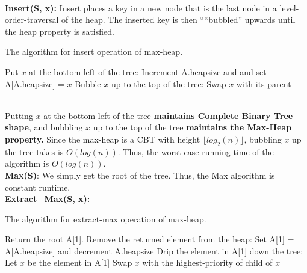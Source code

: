 \documentclass{article}
\begin{document}
\\
\textbf{Insert(S, x): }Insert places a key in a new node that is the last node in a level-order-traversal of the heap. The inserted key is then “``bubbled'' upwards until the heap property is satisfied.
\begin{algorithm}
\caption{The algorithm for insert operation of max-heap.}\label{euclid}
\begin{algorithmic}
\State Put $x$ at the bottom left of the tree:
\State Increment A.heapsize and and set A[A.heapsize] = $x$
\State Bubble $x$ up to the top of the tree:
\State Swap $x$ with its parent
\end{algorithmic}
\end{algorithm}
\\
Putting $x$ at the bottom left of the tree \textbf{maintains Complete Binary Tree shape}, and bubbling $x$ up to the top of the tree \textbf{maintains the Max-Heap property.} Since the max-heap is a CBT with height $\lfloor log_2(n)\rfloor$, bubbling $x$ up the tree takes is $O(log(n))$. Thus, the worst case running time of the algorithm is $O(log(n))$.\\
\textbf{Max(S)}: We simply get the root of the tree. Thus, the Max algorithm is constant runtime. \\
\textbf{Extract\_Max(S, x): }
\begin{algorithm}
\caption{The algorithm for extract-max operation of max-heap.}\label{euclid}
\begin{algorithmic}
\State Return the root A[1].
\State Remove the returned element from the heap: 
\State \indent Set A[1] = A[A.heapsize] and decrement A.heapsize
\State Drip the element in A[1] down the tree:
\State \indent Let $x$ be the element in A[1]
\State Swap $x$ with the highest-priority of child of $x$
\end{algorithmic}
\end{algorithm}
\end{document}
